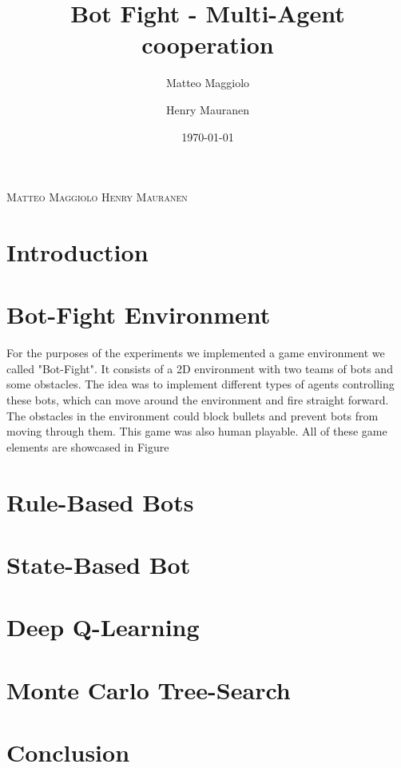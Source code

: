 \documentclass{article}
\title{Bot Fight - Multi-Agent cooperation}
\author{Matteo Maggiolo \and Henry Mauranen}
\date{\today}
\begin{document}
	
	\makeatletter
	\begin{center}
		{\scshape\LARGE{\@title}\par}
		{\scshape\normalsize Matteo Maggiolo \hspace{2cm} Henry Mauranen \par}
		{\scshape\normalsize\@date\par}
	\end{center}
	\makeatother
	
	\section{Introduction}
	
	
	
	\section{Bot-Fight Environment}
	For the purposes of the experiments we implemented a game environment we called "Bot-Fight". It consists of a 2D environment with two teams of bots and some obstacles. The idea was to implement different types of agents controlling these bots, which can move around the environment and fire straight forward. The obstacles in the environment could block bullets and prevent bots from moving through them. This game was also human playable. All of these game elements are showcased in Figure 
	
	
	\section{Rule-Based Bots}
	
	
	
	\section{State-Based Bot}
	
	
	
	\section{Deep Q-Learning}
	
	
	
	\section{Monte Carlo Tree-Search}
	
	
	
	\section{Conclusion}
	
	
	
\end{document}
